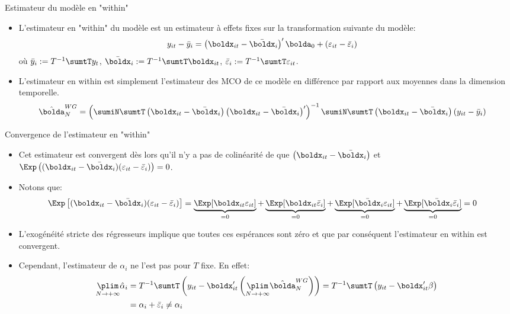 \begin{frame}[allowframebreaks]{Estimateur du modèle en "within"}
\begin{itemize}
    \item L'estimateur en "within" du modèle est un estimateur à effets fixes sur la transformation suivante du modèle:
    \begin{align*}
        y_{it} - \bar{y}_i &= \left(\boldx_{it} - \bar{\boldx}_i\right)^\prime\bolda_0 + (\varepsilon_{it}-\bar{\varepsilon}_i)
        \end{align*}
        où $\bar{y}_i := T^{-1}\sumtT y_{t}$, $\bar{\boldx}_i := T^{-1}\sumtT \boldx_{it}$, $\bar{\varepsilon}_i := T^{-1}\sumtT \varepsilon_{it}$.
        \item L'estimateur en within est simplement l'estimateur des MCO de ce modèle 
        en différence par rapport aux moyennes dans la dimension temporelle.
        \begin{align*}
        \hat{\bolda}^{WG}_N&=\left(\sumiN\sumtT \left(\boldx_{it} - \bar{\boldx}_i\right) \left(\boldx_{it} - \bar{\boldx}_i\right)^\prime\right)^{-1}
        \sumiN\sumtT \left(\boldx_{it} - \bar{\boldx}_i\right)\left(y_{it} - \bar{y}_i\right)
        \end{align*}
\end{itemize}
\end{frame}

\begin{frame}[allowframebreaks]{Convergence de l'estimateur en "within"}
\begin{itemize}
    \item Cet estimateur est convergent dès lors qu'il n'y a pas de colinéarité  de que $\left(\boldx_{it} - \bar{\boldx}_i\right) $ et
    $\Exp\left((\boldx_{it} - \bar{\boldx}_i) (\varepsilon_{it} - \bar{\varepsilon}_i)\right) = 0$.
    
    \item Notons que:
    \begin{align*}
    \Exp\left[(\boldx_{it} - \bar{\boldx}_i) (\varepsilon_{it} - \bar{\varepsilon}_i)\right]  &=\underbrace{\Exp[\boldx_{it}\varepsilon_{it}]}_{=0} +
    \underbrace{\Exp[\boldx_{it}\bar{\varepsilon}_i]}_{=0} + \underbrace{\Exp[\bar{\boldx}_i\varepsilon_{it}]}_{=0} + 
    \underbrace{\Exp[\bar{\boldx}_i\bar{\varepsilon}_i]}_{=0}=0
    \end{align*}
    
    \item L'exogénéité stricte des régresseurs implique que toutes ces espérances sont zéro et 
    que par conséquent l'estimateur en within 
    est convergent.
    \item Cependant, l'estimateur de $\alpha_i$ ne l'est pas pour $T$ fixe. En effet:
    \begin{align*}
    \underset{N\to + \infty}{\plim} \hat{\alpha}_i &= T^{-1}\sumtT\left(y_{it} - \boldx_{it}^\prime\left(\underset{N\to +\infty}{\plim} \hat{\bolda}_N^{WG}\right)\right) = T^{-1}\sumtT\left(y_{it}- \boldx_{it}^\prime\beta\right)\\
    &=\alpha_i + \bar{\varepsilon}_i\neq \alpha_i
    \end{align*}
\end{itemize}
\end{frame}

